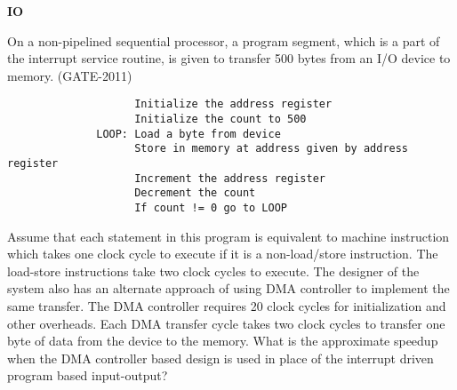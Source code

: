 
\centerline{\textbf{ \LARGE IO }}

\begin{questyle}
  \question  On a non-pipelined sequential processor, a program segment, which is a part of the
             interrupt service routine, is given to transfer 500 bytes from an I/O device to memory.  (GATE-2011)
              \begin{lstlisting}
                    Initialize the address register
                    Initialize the count to 500
              LOOP: Load a byte from device
                    Store in memory at address given by address register
                    Increment the address register
                    Decrement the count
                    If count != 0 go to LOOP
              \end{lstlisting}
              Assume that each statement in this program is equivalent to machine instruction which
              takes one clock cycle to execute if it is a non-load/store instruction. The load-store
              instructions take two clock cycles to execute. The designer of the system also has an
              alternate approach of using DMA controller to implement the same transfer. The DMA
              controller requires 20 clock cycles for initialization and other overheads. Each DMA
              transfer cycle takes two clock cycles to transfer one byte of data from the device to
              the memory. What is the approximate speedup when the DMA controller based design is
              used in place of the interrupt driven program based input-output?
  \begin{choices}
  \end{choices}
\end{questyle}
